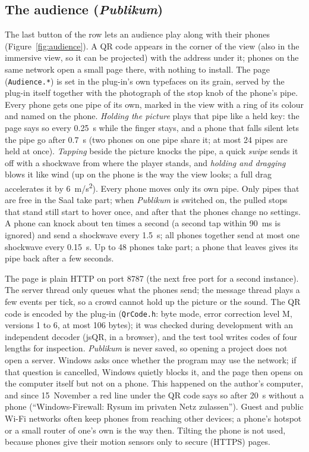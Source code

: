 \documentclass[11pt,a4paper,parskip=half,DIV=11,toc=bibliography]{scrartcl}
\newcommand{\ui}[1]{\emph{#1}}                 %
\newcommand{\fn}[1]{\mbox{\texttt{#1}}}
\begin{document}
\subsection{The audience (\ui{Publikum})}
\label{sec:audience}
The last button of the row lets an audience play along with their phones (Figure~\ref{fig:audience}). A QR code appears in the corner of the view (also in the
immersive view, so it can be projected) with the address under it; phones on the same network open a small page there, with nothing to install. The page
(\fn{Audience.*}) is set in the plug-in's own typefaces on its grain, served by the plug-in itself together with the photograph of the stop knob of the
phone's pipe. Every phone gets one pipe of its own, marked in the view with a ring of its colour and named on the phone. \emph{Holding the picture} plays
that pipe like a held key: the page says so every \SI{0.25}{s} while the finger stays, and a phone that falls silent lets the pipe go after \SI{0.7}{s}
(two phones on one pipe share it; at most 24 pipes are held at once). \emph{Tapping} beside the picture knocks the pipe, a quick \emph{swipe} sends it off
with a shockwave from where the player stands, and \emph{holding and dragging} blows it like wind (up on the phone is the way the view looks; a full drag
accelerates it by \SI{6}{m/s^2}). Every phone moves only its own pipe. Only pipes that are free in the Saal take part; when \ui{Publikum} is switched on, the
pulled stops that stand still start to hover once, and after that the phones change no settings. A phone can knock about ten times a second (a second tap
within \SI{90}{ms} is ignored) and send a shockwave every \SI{1.5}{s}; all phones together send at most one shockwave every \SI{0.15}{s}. Up to 48 phones
take part; a phone that leaves gives its pipe back after a few seconds.

The page is plain HTTP on port 8787 (the next free port for a second instance). The server thread only queues what the phones send; the message thread
plays a few events per tick, so a crowd cannot hold up the picture or the sound. The QR code is encoded by the plug-in (\fn{QrCode.h}: byte mode, error
correction level M, versions 1 to 6, at most 106 bytes); it was checked during development with an independent decoder (jsQR, in a browser), and the
test tool writes codes of four lengths for inspection. \ui{Publikum} is never saved,
so opening a project does not open a server. Windows asks once whether the program may use the network; if that question is cancelled, Windows quietly
blocks it, and the page then opens on the computer itself but not on a phone. This happened on the author's computer, and since 15~November a red line
under the QR code says so after \SI{20}{s} without a phone (\enquote{Windows-Firewall: Rysum im privaten Netz zulassen}). Guest and public Wi-Fi networks often keep phones from
reaching other devices; a phone's hotspot or a small router of one's own is the way then. Tilting the phone is not used, because phones give their motion
sensors only to secure (HTTPS) pages.
\end{document}
